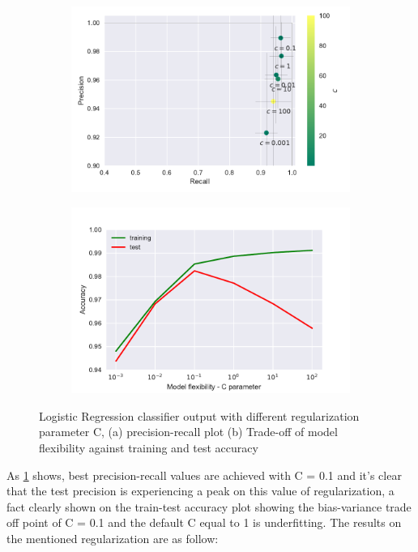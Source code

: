 \documentclass[12pt, a4paper]{scrartcl}
\begin{document}
\begin{figure}[h]
    \centering
    \begin{subfigure}{0.45\textwidth}
        \includegraphics[width=\textwidth]{logistic_regression}
        \caption{}
        \label{fig:logistic_regression}
    \end{subfigure}
    \begin{subfigure}{0.45\textwidth}
        \includegraphics[width=\textwidth]{tradeoff_lr}
        \caption{}
        \label{fig:tradeoff_lr}
    \end{subfigure}
    \caption{Logistic Regression classifier output with different regularization parameter C, (a) precision-recall plot (b) Trade-off of model flexibility against training and test accuracy}\label{fig:LR}
\end{figure}


As \cref{fig:logistic_regression} shows, best precision-recall values are achieved with C = 0.1 and it's clear that the test precision is experiencing a peak on this value of regularization, a fact clearly shown on the train-test accuracy plot showing the bias-variance trade off point of C = 0.1 and the default C equal to 1 is underfitting. The results on the mentioned regularization are as follow:
\end{document}
